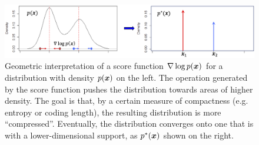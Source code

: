 \documentclass[../../book-main.tex]{subfiles}
\begin{document}
\begin{figure}
    \centering
    \includegraphics[width=1\linewidth]{figs_chap1/Density-compress.png}
    \caption{Geometric interpretation of a score function $\nabla \log p(\bm{x})$ for a distribution with density $p(\bm{x})$ on the left. The operation generated by the score function pushes the distribution towards areas of higher density. The goal is that, by a certain measure of compactness (e.g. entropy or coding length), the resulting distribution is more ``compressed''. Eventually, the distribution converges onto one that is with a lower-dimensional support, as $p^*(\bm{x})$ shown on the right.}
    \label{fig:score-function}
\end{figure}
\end{document}
